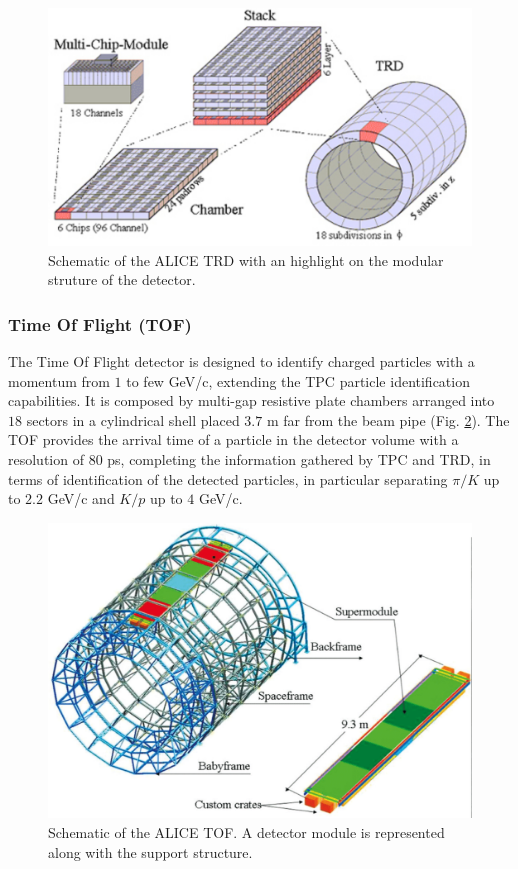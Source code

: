 \begin{figure}[!h]
\begin{center}
\includegraphics[width=0.7\linewidth]{Chapters/Introduction/Figs/trd.pdf}
\caption{Schematic of the ALICE TRD with an highlight on the modular struture of the detector.}
\label{fig:TRD}
\end{center}
\end{figure}

\subsubsection{Time Of Flight (TOF)}
The Time Of Flight detector is designed to identify charged particles with a momentum from $1$ to few GeV/c, extending the TPC particle identification capabilities. 
It is composed by multi-gap resistive plate chambers arranged into $18$ sectors in a cylindrical shell placed $3.7$ m far from the beam pipe (Fig. \ref{fig:TOF}). 
The TOF provides the arrival time of a particle in the detector volume with a resolution of $80$ ps, completing the information gathered by TPC and TRD, in terms of identification of the detected particles, in particular separating $\pi/K$ up to $2.2$ GeV/c and $K/p$ up to $4$ GeV/c.

\begin{figure}[!h]
\begin{center}
\includegraphics[width=0.7\linewidth]{Chapters/Introduction/Figs/tof.pdf}
\caption{Schematic of the ALICE TOF. A detector module is represented along with the support structure.}
\label{fig:TOF}
\end{center}
\end{figure}

